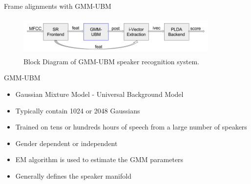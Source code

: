 \documentclass{beamer}
\begin{document}
\begin{frame}{Frame alignments with GMM-UBM}
\begin{figure}
      \centering
      \includegraphics[width=10cm, height=2cm]{figures/UBM_blockdiagram.png}
      \vspace{-4pt}
      \caption{Block Diagram of GMM-UBM speaker recognition system.}
      \label{fig:gmm_ivec1}
  \end{figure}
  \vspace{-15pt}
\begin{block}{GMM-UBM}
\begin{itemize}
    \item Gaussian Mixture Model - Universal Background Model
    \item Typically contain 1024 or 2048 Gaussians
    \item Trained on tens or hundreds hours of speech from a large number of speakers
    \item Gender dependent or independent
    \item EM algorithm is used to estimate the GMM parameters
    \item Generally defines the speaker manifold
\end{itemize}
\end{block}
\end{frame}
%
\end{document}
